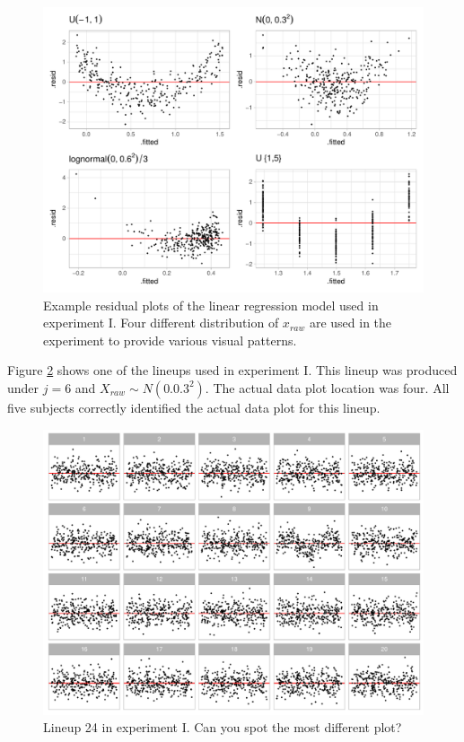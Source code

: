 \documentclass[]{interact}
\theoremstyle{plain}%
\theoremstyle{definition}
\theoremstyle{remark}
\begin{document}
\begin{figure}
\includegraphics[width=1\linewidth]{paper_comparison_files/figure-latex/different-dist-1} \caption{Example residual plots of the linear regression model used in experiment I. Four different distribution of $x_{raw}$ are used in the experiment to provide various visual patterns.}\label{fig:different-dist}
\end{figure}

Figure \ref{fig:example-lineup} shows one of the lineups used in
experiment I. This lineup was produced under \(j = 6\) and
\(X_{raw} \sim N(0.0.3^2)\). The actual data plot location was four. All
five subjects correctly identified the actual data plot for this lineup.

\begin{figure}
\includegraphics[width=1\linewidth]{paper_comparison_files/figure-latex/example-lineup-1} \caption{Lineup 24 in experiment I. Can you spot the most different plot? \label{fig:example-lineup}}\label{fig:example-lineup}
\end{figure}
\end{document}

